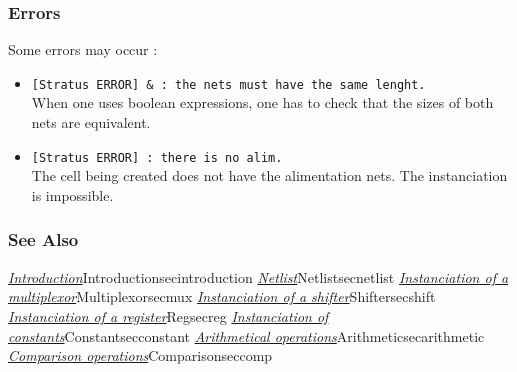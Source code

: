 \subsubsection{Errors}
    
Some errors may occur :
\begin{itemize}
    \item \verb-[Stratus ERROR] & : the nets must have the same lenght.-\\When one uses boolean expressions, one has to check that the sizes of both nets are equivalent.
    \item \verb-[Stratus ERROR] : there is no alim.-\\The cell being created does not have the alimentation nets. The instanciation is impossible.
\end{itemize}

\begin{htmlonly}

\subsubsection{See Also}

\hyperref[ref]{\emph{Introduction}}{}{Introduction}{secintroduction}
\hyperref[ref]{\emph{Netlist}}{}{Netlist}{secnetlist}
\hyperref[ref]{\emph{Instanciation of a multiplexor}}{}{Multiplexor}{secmux}
\hyperref[ref]{\emph{Instanciation of a shifter}}{}{Shifter}{secshift}
\hyperref[ref]{\emph{Instanciation of a register}}{}{Reg}{secreg}
\hyperref[ref]{\emph{Instanciation of constants}}{}{Constant}{secconstant}
\hyperref[ref]{\emph{Arithmetical operations}}{}{Arithmetic}{secarithmetic}
\hyperref[ref]{\emph{Comparison operations}}{}{Comparison}{seccomp}

\end{htmlonly}
